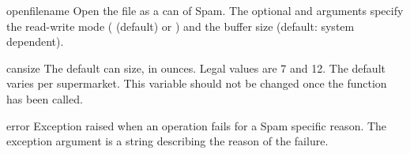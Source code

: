 
\begin{funcdesc}{open}{filename}
Open the file  as a can of Spam.  The optional
 and  arguments specify the read-write mode
( (default) or ) and the buffer size (default:
system dependent).
\end{funcdesc}


\begin{datadesc}{cansize}
The default can size, in ounces.  Legal values are 7 and 12.  The
default varies per supermarket.  This variable should not be changed
once the  function has been called.
\end{datadesc}


\begin{excdesc}{error}
Exception raised when an operation fails for a Spam specific reason.
The exception argument is a string describing the reason of the
failure.
\end{excdesc}




